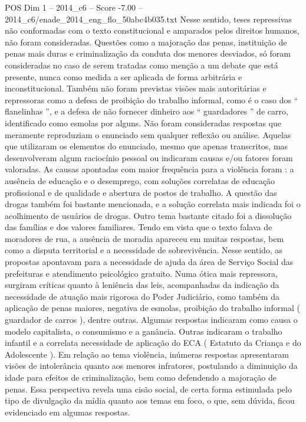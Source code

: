 \begin{textsample}{POS Dim 1 – 2014\_c6 – Score -7.00 – 2014\_c6/enade\_2014\_eng\_flo\_50abc4b035.txt}
Nesse sentido, teses repressivas não conformadas com o texto constitucional e amparados pelos direitos humanos, não foram consideradas.
Questões como a majoração das penas, instituição de penas mais duras e criminalização da conduta dos menores desviados, só foram consideradas no caso de serem tratadas como menção a um debate que está presente, nunca como medida a ser aplicada de forma arbitrária e inconstitucional.
Também não foram previstas visões mais autoritárias e repressoras como a defesa de proibição do trabalho informal, como é o caso dos “ flanelinhas ”, e a defesa de não fornecer dinheiro aos “ guardadores ” de carro, identificado como esmolas por alguns.
Não foram consideradas respostas que meramente reproduziam o enunciado sem qualquer reflexão ou análise.
Aquelas que utilizaram os elementos do enunciado, mesmo que apenas transcritos, mas desenvolveram algum raciocínio pessoal ou indicaram causas e/ou fatores foram valoradas.
As causas apontadas com maior frequência para a violência foram : a ausência de educação e o desemprego, com soluções correlatas de educação profissional e de qualidade e abertura de postos de trabalho.
A questão das drogas também foi bastante mencionada, e a solução correlata mais indicada foi o acolhimento de usuários de drogas.
Outro tema bastante citado foi a dissolução das famílias e dos valores familiares.
Tendo em vista que o texto falava de moradores de rua, a ausência de moradia apareceu em muitas respostas, bem como a disputa territorial e a necessidade de sobrevivência.
Nesse sentido, as propostas apontavam para a necessidade de ajuda da área de Serviço Social das prefeituras e atendimento psicológico gratuito.
Numa ótica mais repressora, surgiram críticas quanto à leniência das leis, acompanhadas da indicação da necessidade de atuação mais rigorosa do Poder Judiciário, como também da aplicação de penas maiores, negativa de esmolas, proibição do trabalho informal ( guardador de carros ), dentre outras.
Algumas respostas indicaram como causa o modelo capitalista, o consumismo e a ganância.
Outras indicaram o trabalho infantil e a correlata necessidade de aplicação do ECA ( Estatuto da Criança e do Adolescente ).
Em relação ao tema violência, inúmeras respostas apresentaram visões de intolerância quanto aos menores infratores, postulando a diminuição da idade para efeitos de criminalização, bem como defendendo a majoração de penas.
Essa perspectiva revela uma cisão social, de certa forma estimulada pelo tipo de divulgação da mídia quanto aos temas em foco, o que, sem dúvida, ficou evidenciado em algumas respostas.

\end{textsample}
